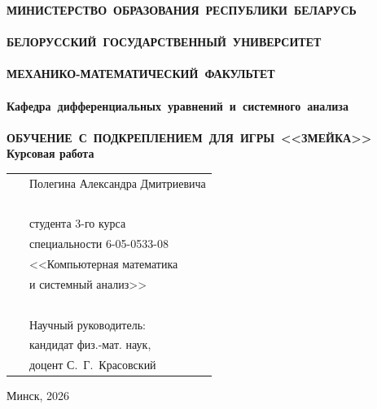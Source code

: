\documentclass[14pt,a4paper]{extreport}
\begin{document}

\setcounter{page}{1}
\thispagestyle{empty}
\begin{center}
\bfseries
\vspace{4cm}
{
\mbox{МИНИСТЕРСТВО~ОБРАЗОВАНИЯ~РЕСПУБЛИКИ~БЕЛАРУСЬ} \\~\\
\mbox{БЕЛОРУССКИЙ~ГОСУДАРСТВЕННЫЙ~УНИВЕРСИТЕТ} \\~\\
\mbox{МЕХАНИКО-МАТЕМАТИЧЕСКИЙ~ФАКУЛЬТЕТ} \\~\\
\mbox{Кафедра~дифференциальных~уравнений~и~системного~анализа} \\~\\
}
\vspace{4cm}
\mbox{ОБУЧЕНИЕ С ПОДКРЕПЛЕНИЕМ ДЛЯ ИГРЫ <<ЗМЕЙКА>>}\\
\vspace{1cm}
\rmfamily Курсовая работа
\vspace{3cm}
\end{center}

\begin{tabular}{ll}
\hspace{10.5cm}
&Полегина Александра Дмитриевича\\~\\
&студента 3-го курса\\
&специальности 6-05-0533-08\\
&<<Компьютерная математика\\
&и системный анализ>>\\~\\
&Научный руководитель:\\
&кандидат физ.-мат. наук,\\
&доцент С.~Г.~Красовский
\end{tabular}
\vspace{4cm}
\begin{center}
    Минск, 2026
\end{center}
\clearpage
\restoregeometry
{}

\tableofcontents
\clearpage








\nocite{sutton2020rl,matthes2023python}
\printbibliography[heading=bibintoc,title={СПИСОК ИСПОЛЬЗОВАННОЙ ЛИТЕРАТУРЫ}]

\end{document}
